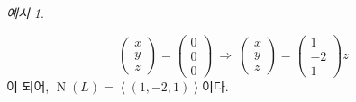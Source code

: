 \documentclass[unfonts,oneside,a4paper]{oblivoir}
\theoremstyle{definition}
\theoremstyle{theorem}
\theoremstyle{theorem}
\theoremstyle{remark}
\theoremstyle{remark}
\theoremstyle{remark}
\newtheorem*{example}{예시}
\theoremstyle{remark}
\DeclareMathOperator{\Null}{N}
\begin{document}
\begin{example}
\begin{enumerate}
\begin{solution}
\begin{equation*}
\begin{pmatrix}
                    x \\ y \\ z
                    \end{pmatrix} = \begin{pmatrix}
                    0 \\ 0 \\ 0
                    \end{pmatrix} \ \Rightarrow \ \begin{pmatrix}
                    x \\ y \\ z
                    \end{pmatrix} = \begin{pmatrix}
                    1 \\ -2 \\ 1
                \end{pmatrix} z
            \end{equation*}
            이 되어, $\Null (L) = \left<(1, -2, 1)\right>$이다.
        \end{solution}


\end{enumerate}
\end{example}
\end{document}
